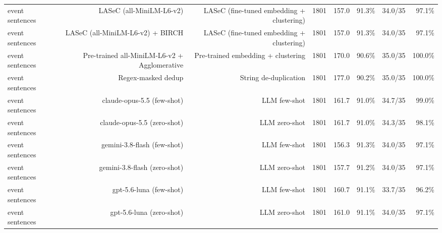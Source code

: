 \begin{table}[t]
\begin{tabular}{lrrrrrrr}
event sentences & LASeC (all-MiniLM-L6-v2) & LASeC (fine-tuned embedding + clustering) & 1801 & 157.0 & 91.3\% & 34.0/35 & 97.1\% \\
event sentences & LASeC (all-MiniLM-L6-v2) + BIRCH & LASeC (fine-tuned embedding + clustering) & 1801 & 157.0 & 91.3\% & 34.0/35 & 97.1\% \\
event sentences & Pre-trained all-MiniLM-L6-v2 + Agglomerative & Pre-trained embedding + clustering & 1801 & 170.0 & 90.6\% & 35.0/35 & 100.0\% \\
event sentences & Regex-masked dedup & String de-duplication & 1801 & 177.0 & 90.2\% & 35.0/35 & 100.0\% \\
event sentences & claude-opus-5.5 (few-shot) & LLM few-shot & 1801 & 161.7 & 91.0\% & 34.7/35 & 99.0\% \\
event sentences & claude-opus-5.5 (zero-shot) & LLM zero-shot & 1801 & 161.7 & 91.0\% & 34.3/35 & 98.1\% \\
event sentences & gemini-3.8-flash (few-shot) & LLM few-shot & 1801 & 156.3 & 91.3\% & 34.0/35 & 97.1\% \\
event sentences & gemini-3.8-flash (zero-shot) & LLM zero-shot & 1801 & 157.7 & 91.2\% & 34.0/35 & 97.1\% \\
event sentences & gpt-5.6-luna (few-shot) & LLM few-shot & 1801 & 160.7 & 91.1\% & 33.7/35 & 96.2\% \\
event sentences & gpt-5.6-luna (zero-shot) & LLM zero-shot & 1801 & 161.0 & 91.1\% & 34.0/35 & 97.1\% \\
\bottomrule
\end{tabular}
\end{table}